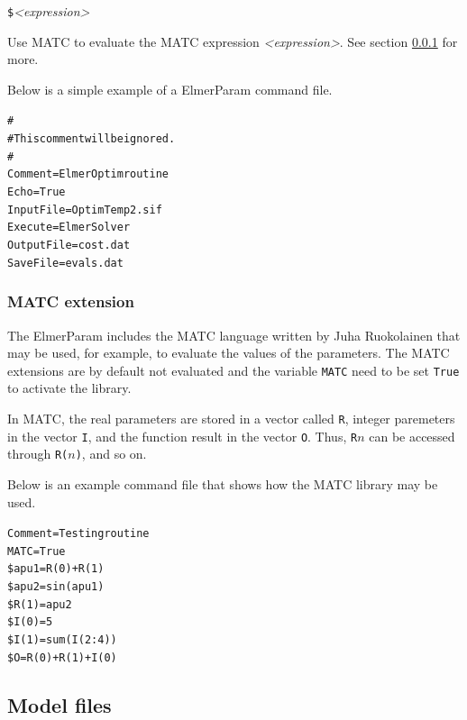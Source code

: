 \documentclass[12pt,a4paper]{article}
\newcommand{\ttbegin}{\begin{alltt}}
\newcommand{\ttend}{\end{alltt}}
\newcommand{\code}[1]{\texttt{#1}}
\begin{document}
\begin{description}
%

\item{\code{\$}\textit{<expression>}}

Use MATC to evaluate the MATC expression \textit{<expression>}.  See
section \ref{MATC} for more.

\end{description}

Below is a simple example of a ElmerParam command file. 
\ttbegin
#
# This comment will be ignored.
#
Comment = ElmerOptim routine 
Echo = True
Input File = OptimTemp2.sif
Execute = ElmerSolver
Output File = cost.dat
Save File = evals.dat
\ttend

\subsubsection{MATC extension}\label{MATC}

The ElmerParam includes the MATC language written by Juha Ruokolainen that
may be used, for example, to evaluate the values of the parameters.  The
MATC extensions are by default not evaluated and the variable \code{MATC}
need to be set \code{True} to activate the library. 

In MATC, the real parameters are stored in a vector called \code{R}, 
integer paremeters in the vector \code{I}, and the function result in the
vector \code{O}.  Thus, \code{R}$n$ can be
accessed through \code{R($n$)}, and so on.

Below is an example command file that shows how the MATC library may be
used.
\ttbegin
Comment = Testing routine
MATC = True
\$ apu1 = R(0) + R(1)
\$ apu2 = sin(apu1)
\$ R(1) = apu2 
\$ I(0) = 5
\$ I(1) = sum(I(2:4))
\$ O = R(0) + R(1) + I(0)
\ttend



\subsection{Model files}\label{modelfiles}
\end{document}
